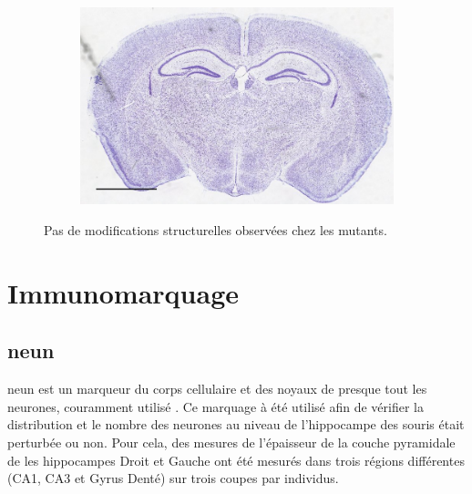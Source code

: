 \begin{figure}[h]
\begin{center}
\begin{subfigure}[h]{0.49\textwidth}
			\end{subfigure}
			\begin{subfigure}[h]{0.49\textwidth}%
				\caption{}
				\label{fig:MaleMutNissl}
				\includegraphics[width=\textwidth]{./Images/Nissl/MaleMut.jpg}
			\end{subfigure}
		\end{center}
		\caption{Pas de modifications structurelles observées chez les mutants.}
		\label{fig:NisslResultat}
	\end{figure}

\section{Immunomarquage}
\label{sec:IHC}

	\subsection{\acrshort{neun}}
	\label{ssec:neun}
	\Acrshort{neun} est un marqueur du  corps cellulaire et des noyaux de presque tout les neurones, couramment utilisé \cite{Guselnikova2015}. Ce marquage à été utilisé afin de vérifier la distribution et le nombre des neurones au niveau de l'hippocampe des souris \mcrd était perturbée ou non. Pour cela, des mesures de l'épaisseur de la couche pyramidale de les hippocampes Droit et Gauche ont été mesurés dans trois régions différentes (CA1, CA3 et Gyrus Denté) sur trois coupes par individus.
	

